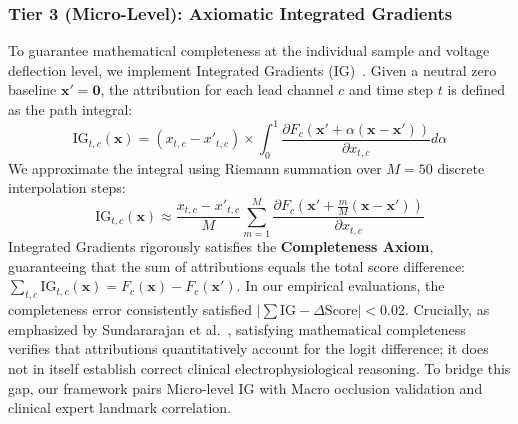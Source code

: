 \documentclass[5p,twocolumn,10pt]{elsarticle}
\begin{document}
\subsubsection{Tier 3 (Micro-Level): Axiomatic Integrated Gradients}
To guarantee mathematical completeness at the individual sample and voltage deflection level, we implement Integrated Gradients (IG)~\cite{sundararajan2017axiomatic}. Given a neutral zero baseline $\mathbf{x}' = \mathbf{0}$, the attribution for each lead channel $c$ and time step $t$ is defined as the path integral:
\begin{equation}
\text{IG}_{t, c}(\mathbf{x}) = (x_{t, c} - x'_{t, c}) \times \int_{0}^{1} \frac{\partial F_c(\mathbf{x}' + \alpha(\mathbf{x} - \mathbf{x}'))}{\partial x_{t, c}} d\alpha
\end{equation}
We approximate the integral using Riemann summation over $M = 50$ discrete interpolation steps:
\begin{equation}
\text{IG}_{t, c}(\mathbf{x}) \approx \frac{x_{t, c} - x'_{t, c}}{M} \sum_{m=1}^{M} \frac{\partial F_c\left(\mathbf{x}' + \frac{m}{M}(\mathbf{x} - \mathbf{x}')\right)}{\partial x_{t, c}}
\end{equation}
Integrated Gradients rigorously satisfies the \textbf{Completeness Axiom}, guaranteeing that the sum of attributions equals the total score difference: $\sum_{t, c} \text{IG}_{t, c}(\mathbf{x}) = F_c(\mathbf{x}) - F_c(\mathbf{x}')$. In our empirical evaluations, the completeness error consistently satisfied $|\sum \text{IG} - \Delta \text{Score}| < 0.02$. Crucially, as emphasized by Sundararajan et al.~\cite{sundararajan2017axiomatic}, satisfying mathematical completeness verifies that attributions quantitatively account for the logit difference; it does not in itself establish correct clinical electrophysiological reasoning. To bridge this gap, our framework pairs Micro-level IG with Macro occlusion validation and clinical expert landmark correlation.
\end{document}
